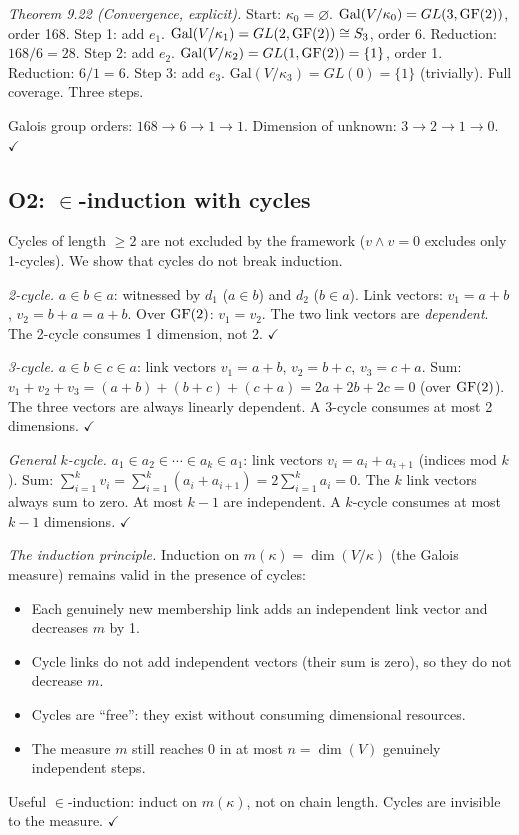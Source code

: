 \emph{Theorem 9.22 (Convergence, explicit).}
Start: $\kappa_0 = \varnothing$.
$\mathrm{Gal}(V/\kappa_0) = GL(3, \operatorname{GF}(2))$, order 168.
Step 1: add $e_1$. $\mathrm{Gal}(V/\kappa_1) = GL(2,
\operatorname{GF}(2)) \cong S_3$, order 6. Reduction: $168/6 = 28$.
Step 2: add $e_2$. $\mathrm{Gal}(V/\kappa_2) = GL(1,
\operatorname{GF}(2)) = \{1\}$, order 1. Reduction: $6/1 = 6$.
Step 3: add $e_3$. $\mathrm{Gal}(V/\kappa_3) = GL(0)
= \{1\}$ (trivially). Full coverage. Three steps.

Galois group orders: $168 \to 6 \to 1 \to 1$.
Dimension of unknown: $3 \to 2 \to 1 \to 0$.
$\checkmark$

\subsection{O2: $\in$-induction with cycles}
\label{app:o2-cycles}

Cycles of length $\geq 2$ are not excluded by the
framework ($v \wedge v = 0$ excludes only 1-cycles).
We show that cycles do not break induction.

\emph{2-cycle.}
$a \in b \in a$: witnessed by $d_1$ ($a \in b$) and
$d_2$ ($b \in a$). Link vectors: $v_1 = a + b$,
$v_2 = b + a = a + b$. Over $\operatorname{GF}(2)$: $v_1 = v_2$.
The two link vectors are \emph{dependent}. The 2-cycle
consumes 1 dimension, not 2. $\checkmark$

\emph{3-cycle.}
$a \in b \in c \in a$: link vectors $v_1 = a + b$,
$v_2 = b + c$, $v_3 = c + a$. Sum:
$v_1 + v_2 + v_3 = (a + b) + (b + c) + (c + a)
= 2a + 2b + 2c = 0$ (over $\operatorname{GF}(2)$). The three
vectors are always linearly dependent. A 3-cycle
consumes at most 2 dimensions. $\checkmark$

\emph{General $k$-cycle.}
$a_1 \in a_2 \in \cdots \in a_k \in a_1$: link vectors
$v_i = a_i + a_{i+1}$ (indices mod $k$). Sum:
$\sum_{i=1}^k v_i = \sum_{i=1}^k (a_i + a_{i+1})
= 2\sum_{i=1}^k a_i = 0$. The $k$ link vectors always
sum to zero. At most $k - 1$ are independent. A
$k$-cycle consumes at most $k - 1$ dimensions.
$\checkmark$

\emph{The induction principle.}
Induction on $m(\kappa) = \dim(V/\kappa)$ (the Galois
measure) remains valid in the presence of cycles:
\begin{itemize}[nosep]
  \item Each genuinely new membership link adds an
    independent link vector and decreases $m$ by 1.
  \item Cycle links do not add independent vectors
    (their sum is zero), so they do not decrease $m$.
  \item Cycles are ``free'': they exist without consuming
    dimensional resources.
  \item The measure $m$ still reaches 0 in at most
    $n = \dim(V)$ genuinely independent steps.
\end{itemize}
Useful $\in$-induction: induct on $m(\kappa)$, not on
chain length. Cycles are invisible to the measure.
$\checkmark$


